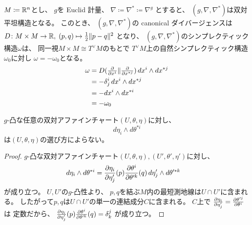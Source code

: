 \documentclass[report]{jlreq}
\begin{document}
\begin{example}[$M = \R^n$の場合]
    $M \coloneqq \mathbb{R}^n$とし、
    $g$を Euclid 計量、
    $\nabla \coloneqq \nabla^* \coloneqq \nabla^g$
    とすると、
    $(g, \nabla, \nabla^*)$は双対平坦構造となる。
    このとき、
    $(g, \nabla, \nabla^*)$の canonical ダイバージェンスは
    $D \colon M \times M \to \mathbb{R}, \;
        (p, q) \mapsto \frac{1}{2} \| p - q \|^2$
    となり、
    $(g, \nabla, \nabla^*)$のシンプレクティック構造$\omega$は、
    同一視$M \times M \cong T^\vee M$のもとで
    $T^\vee M$上の自然シンプレクティック構造$\omega_0$に対し
    $\omega = - \omega_0$となる。
    \begin{alignat}{1}
        \omega
            &=
                D(\tdeldel{x^i} \| \tdeldel{x^{*j}}) \,
                dx^i \wedge dx^{*j}
                \\
            &=
                - \delta_j^i \,
                dx^i \wedge dx^{*j}
                \\
            &=
                - dx^i \wedge dx^{*i}
                \\
            &=
                - \omega_0
    \end{alignat}
\end{example}

\begin{propdef}[ダイバージェンスを使わない直接的な定義]
    $g$-凸な任意の双対アファインチャート$(U, \theta, \eta)$に対し、
    \begin{equation}
        d\eta_i \wedge d\theta^{*i}
    \end{equation}
    は$(U, \theta, \eta)$の選び方によらない。
\end{propdef}

\begin{proof}
    $g$-凸な双対アファインチャート$(U, \theta, \eta), (U', \theta', \eta')$に対し、
    \begin{alignat}{1}
        d\eta_i \wedge d\theta^{*i}
            &=
                \deldel[\eta_i]{\eta'_j}(p)
                \deldel[\theta^i]{\theta'^k}(q) \,
                d\eta'_j \wedge d\theta'^{*k}
    \end{alignat}
    が成り立つ。
    $U, U'$の$g$-凸性より、
    $p, q$を結ぶ$M$内の最短測地線は$U \cap U'$に含まれる。
    したがって$p, q$は$U \cap U'$の単一の連結成分$C$に含まれる。
    $C$上で
    $\deldel[\eta_i]{\eta'_j} = \deldel[\theta'^j]{\theta^i}$は
    定数だから、
    $\deldel[\eta_i]{\eta'_j}(p)
        \deldel[\theta^i]{\theta'^k}(q) = \delta_k^j$
    が成り立つ。
\end{proof}
\end{document}
